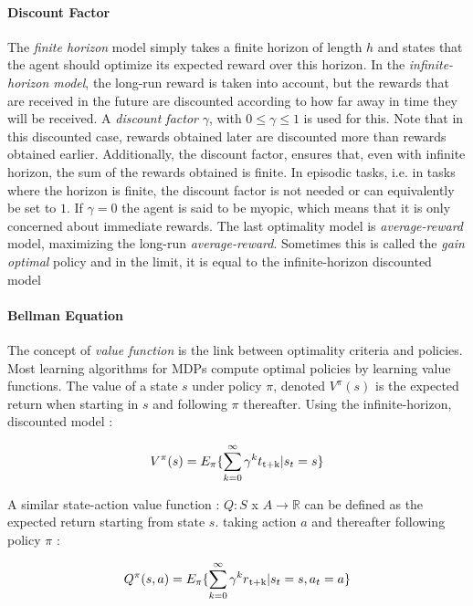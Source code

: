 \paragraph{Discount Factor}The \textit{finite horizon} model simply takes a finite horizon of length $h$ and states that the agent should optimize its expected reward over this horizon. In the \textit{infinite-horizon model}, the long-run reward is taken into account, but the rewards that are received in the future are discounted according to how far away in time they will be received.
A \textit{discount factor} $\gamma$, with $0 \leq \gamma \leq 1$ is used for this. Note that in this discounted case, rewards obtained later are discounted more than rewards obtained earlier. Additionally, the discount factor, ensures that, even with infinite horizon, the sum of the rewards obtained is finite. In episodic tasks, i.e. in tasks where the horizon is finite, the discount factor is not
needed or can equivalently be set to $1$. If $\gamma = 0$ the agent is said to be myopic, which means that it is only concerned about immediate rewards.
The last optimality model is \textit{average-reward} model, maximizing the long-run \textit{average-reward}. Sometimes this is called the \textit{gain optimal} policy and in the limit, it is equal to the infinite-horizon discounted model~\cite{wiering2012reinforcement}

\paragraph{Bellman Equation} The concept of \textit{value function} is the link between optimality criteria and policies. Most learning algorithms for MDPs compute optimal policies by learning value functions. The value of a state $s$ under policy $\pi$, denoted $V^\pi (s)$ is the expected return when starting in $s$ and following $\pi$ thereafter. Using the infinite-horizon, discounted model :

\begin{equation}
	V^\pi (s) = E_\pi \{\sum_{k = 0}^{\infty} \gamma^k t\textsubscript{t+k} | s_t = s\}
\end{equation}

A similar state-action value function : $Q : S$ x $A \rightarrow \mathbb{R}$ can be defined as the expected return starting from state $s$. taking action $a$ and thereafter following policy $\pi$ :

\begin{equation} \label{eq:2.2}
	Q^\pi (s,a) = E_\pi\{\sum_{k = 0}^{\infty} \gamma^k r\textsubscript{t+k} | s_t = s, a_t = a\}
\end{equation}

